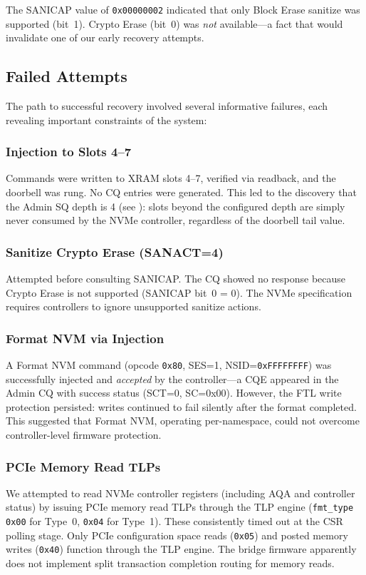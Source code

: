 \documentclass[conference]{IEEEtran}
\begin{document}
The SANICAP value of \texttt{0x00000002} indicated that only Block Erase
sanitize was supported (bit~1). Crypto Erase (bit~0) was \emph{not}
available---a fact that would invalidate one of our early recovery
attempts.


\subsection{Failed Attempts}
\label{sec:failed}

The path to successful recovery involved several informative failures,
each revealing important constraints of the system:

\subsubsection{Injection to Slots 4--7}
Commands were written to XRAM slots 4--7, verified via readback, and the
doorbell was rung. No CQ entries were generated. This led to the
discovery that the Admin SQ depth is 4 (see ):
slots beyond the configured depth are simply never consumed by the NVMe
controller, regardless of the doorbell tail value.

\subsubsection{Sanitize Crypto Erase (SANACT=4)}
Attempted before consulting SANICAP. The CQ showed no response because
Crypto Erase is not supported (SANICAP bit~0 = 0). The NVMe
specification requires controllers to ignore unsupported sanitize
actions.

\subsubsection{Format NVM via Injection}
A Format NVM command (opcode \texttt{0x80}, SES=1, NSID=\texttt{0xFFFFFFFF})
was successfully injected and \emph{accepted} by the controller---a CQE
appeared in the Admin CQ with success status (SCT=0, SC=0x00). However,
the FTL write protection persisted: writes continued to fail silently
after the format completed. This suggested that Format NVM, operating
per-namespace, could not overcome controller-level firmware protection.

\subsubsection{PCIe Memory Read TLPs}
We attempted to read NVMe controller registers (including AQA and
controller status) by issuing PCIe memory read TLPs through the TLP
engine (\texttt{fmt\_type} \texttt{0x00} for Type~0, \texttt{0x04} for
Type~1). These consistently timed out at the CSR polling stage. Only
PCIe configuration space reads (\texttt{0x05}) and posted memory writes
(\texttt{0x40}) function through the TLP engine. The bridge firmware
apparently does not implement split transaction completion routing for
memory reads.
\end{document}
